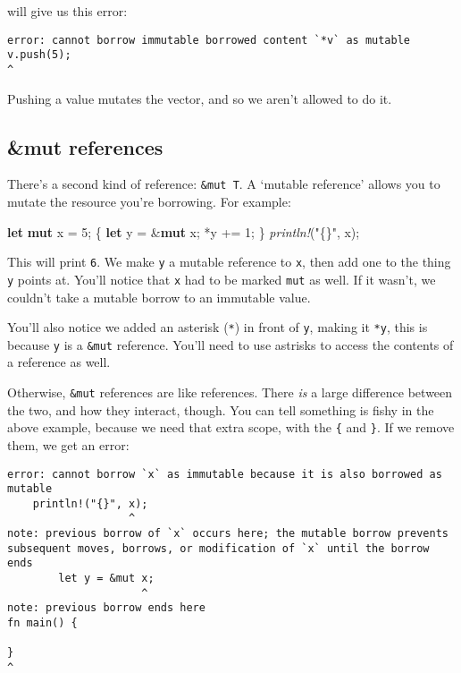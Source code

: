 \documentclass[a4paper,]{book}
\newenvironment{Shaded}{\begin{snugshade}}{\end{snugshade}}
\newcommand{\KeywordTok}[1]{\textcolor[rgb]{0.13,0.29,0.53}{\textbf{{#1}}}}
\newcommand{\DecValTok}[1]{\textcolor[rgb]{0.00,0.00,0.81}{{#1}}}
\newcommand{\StringTok}[1]{\textcolor[rgb]{0.31,0.60,0.02}{{#1}}}
\newcommand{\PreprocessorTok}[1]{\textcolor[rgb]{0.56,0.35,0.01}{\textit{{#1}}}}
\newcommand{\NormalTok}[1]{{#1}}
\begin{document}
will give us this error:

\begin{verbatim}
error: cannot borrow immutable borrowed content `*v` as mutable
v.push(5);
^
\end{verbatim}

Pushing a value mutates the vector, and so we aren't allowed to do it.

\subsection{\&mut references}\label{mut-references}

There's a second kind of reference: \texttt{\&mut\ T}. A `mutable
reference' allows you to mutate the resource you're borrowing. For
example:

\begin{Shaded}
\begin{Highlighting}[]
\KeywordTok{let} \KeywordTok{mut} \NormalTok{x = }\DecValTok{5}\NormalTok{;}
\NormalTok{\{}
    \KeywordTok{let} \NormalTok{y = &}\KeywordTok{mut} \NormalTok{x;}
    \NormalTok{*y += }\DecValTok{1}\NormalTok{;}
\NormalTok{\}}
\PreprocessorTok{println!}\NormalTok{(}\StringTok{"\{\}"}\NormalTok{, x);}
\end{Highlighting}
\end{Shaded}

This will print \texttt{6}. We make \texttt{y} a mutable reference to
\texttt{x}, then add one to the thing \texttt{y} points at. You'll
notice that \texttt{x} had to be marked \texttt{mut} as well. If it
wasn't, we couldn't take a mutable borrow to an immutable value.

You'll also notice we added an asterisk (\texttt{*}) in front of
\texttt{y}, making it \texttt{*y}, this is because \texttt{y} is a
\texttt{\&mut} reference. You'll need to use astrisks to access the
contents of a reference as well.

Otherwise, \texttt{\&mut} references are like references. There
\emph{is} a large difference between the two, and how they interact,
though. You can tell something is fishy in the above example, because we
need that extra scope, with the \texttt{\{} and \texttt{\}}. If we
remove them, we get an error:

\begin{verbatim}
error: cannot borrow `x` as immutable because it is also borrowed as mutable
    println!("{}", x);
                   ^
note: previous borrow of `x` occurs here; the mutable borrow prevents
subsequent moves, borrows, or modification of `x` until the borrow ends
        let y = &mut x;
                     ^
note: previous borrow ends here
fn main() {

}
^
\end{verbatim}
\end{document}
